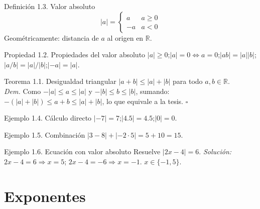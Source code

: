 \documentclass[12pt,letterpaper]{book}
\begin{document}
\begin{defbox}{Definición 1.3. Valor absoluto}
\[ |a| = \begin{cases} a & a\geq0\\ -a & a<0 \end{cases} \]
Geométricamente: distancia de $a$ al origen en $\mathbb{R}$.
\end{defbox}

\begin{center}
\end{center}

\begin{propbox}{Propiedad 1.2. Propiedades del valor absoluto}
$|a|\geq0$;\quad $|a|=0\Leftrightarrow a=0$;\quad $|ab|=|a||b|$;\quad $|a/b|=|a|/|b|$;\quad $|-a|=|a|$.
\end{propbox}

\begin{thmbox}{Teorema 1.1. Desigualdad triangular}
$|a+b|\leq|a|+|b|$ para todo $a,b\in\mathbb{R}$.\\[2pt]
\textit{Dem.} Como $-|a|\leq a\leq|a|$ y $-|b|\leq b\leq|b|$, sumando: $-(|a|+|b|)\leq a+b\leq|a|+|b|$, lo que equivale a la tesis. $\square$
\end{thmbox}

\begin{ejbox}{Ejemplo 1.4. Cálculo directo}
$|-7|=7$;\quad $|4.5|=4.5$;\quad $|0|=0$.
\end{ejbox}

\begin{ejbox}{Ejemplo 1.5. Combinación}
$|3-8|+|-2\cdot5| = 5+10 = 15$.
\end{ejbox}

\begin{ejbox}{Ejemplo 1.6. Ecuación con valor absoluto}
Resuelve $|2x-4|=6$. \textit{Solución:} $2x-4=6\Rightarrow x=5$; $2x-4=-6\Rightarrow x=-1$. $x\in\{-1,5\}$.
\end{ejbox}

\section{Exponentes}
\end{document}
